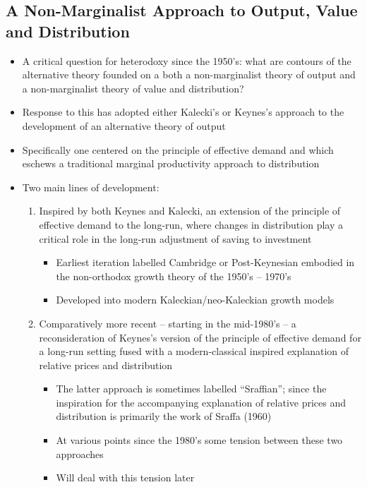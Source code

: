 \documentclass[a4paper,twoside]{article}
\numberwithin{equation}{section}
\numberwithin{figure}{section}
\begin{document}
\subsection{A Non-Marginalist Approach to Output, Value and Distribution}
	\begin{itemize}
		\item A critical question for heterodoxy since the 1950's: what are contours of the alternative theory founded on a both a non-marginalist theory of output and a non-marginalist theory of value and distribution?
		\item Response to this has adopted either Kalecki's or Keynes's approach to the development of an alternative theory of output
		\item Specifically one centered on the principle of effective demand and which eschews a traditional marginal productivity approach to distribution
		\item Two main lines of development:
		\begin{enumerate}[label=\textbf{\arabic*.}]
			\item Inspired by both Keynes and Kalecki, an extension of the principle of effective demand to the long-run, where changes in distribution play a critical role in the long-run adjustment of saving to investment
			\begin{itemize}
				\item Earliest iteration labelled Cambridge or Post-Keynesian embodied in the non-orthodox growth theory of the 1950's -- 1970's
				\item Developed into modern Kaleckian/neo-Kaleckian growth models
			\end{itemize}
			\item Comparatively more recent -- starting in the mid-1980's -- a reconsideration of Keynes's version of the principle of effective demand for a long-run setting fused with a modern-classical inspired explanation of relative prices and distribution
			\begin{itemize}
				\item The latter approach is sometimes labelled ``Sraffian''; since the inspiration for the accompanying explanation of relative prices and distribution is primarily the work of Sraffa (1960)
				\item At various points since the 1980's some tension between these two approaches
				\item Will deal with this tension later
			\end{itemize}
		\end{enumerate}
	\end{itemize}
\end{document}
